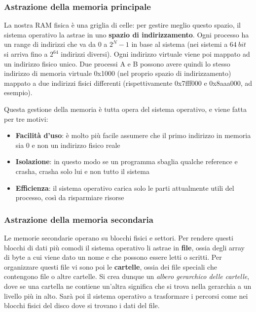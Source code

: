 \documentclass[11pt, a4paper, titlepage, oneside]{scrbook}
\begin{document}
\subsubsection*{Astrazione della memoria principale}

La nostra RAM fisica è una griglia di celle: per gestire meglio questo spazio, il sistema operativo la astrae in uno \textbf{spazio di indirizzamento}. Ogni processo ha un range di indirizzi che va da $0$ a $2^N - 1$ in base al sistema (nei sistemi a $\SI{64}{bit}$ si arriva fino a $2^{64}$ indirizzi diversi). Ogni indirizzo virtuale viene poi mappato ad un indirizzo fisico unico. Due processi A e B possono avere quindi lo stesso indirizzo di memoria virtuale 0x1000 (nel proprio spazio di indirizzamento) mappato a due indirizzi fisici differenti (rispettivamente 0x7fff000 e 0x8aaa000, ad esempio). 

Questa gestione della memoria è tutta opera del sistema operativo, e viene fatta per tre motivi:
\begin{itemize}
    \item \textbf{Facilità d'uso}: è molto più facile assumere che il primo indirizzo in memoria sia 0 e non un indirizzo fisico reale
    \item \textbf{Isolazione}: in questo modo se un programma sbaglia qualche reference e crasha, crasha solo lui e non tutto il sistema
    \item \textbf{Efficienza}: il sistema operativo carica solo le parti attualmente utili del processo, così da risparmiare risorse
\end{itemize}

\subsubsection*{Astrazione della memoria secondaria}

Le memorie secondarie operano su blocchi fisici e settori. Per rendere questi blocchi di dati più comodi il sistema operativo li astrae in \textbf{file}, ossia degli array di byte a cui viene dato un nome e che possono essere letti o scritti. Per organizzare questi file vi sono poi le \textbf{cartelle}, ossia dei file speciali che contengono file o altre cartelle. Si crea dunque un \textit{albero gerarchico delle cartelle}, dove se una cartella ne contiene un'altra significa che si trova nella gerarchia a un livello più in alto. Sarà poi il sistema operativo a trasformare i percorsi come  nei blocchi fisici del disco dove si trovano i dati del file.
\end{document}
